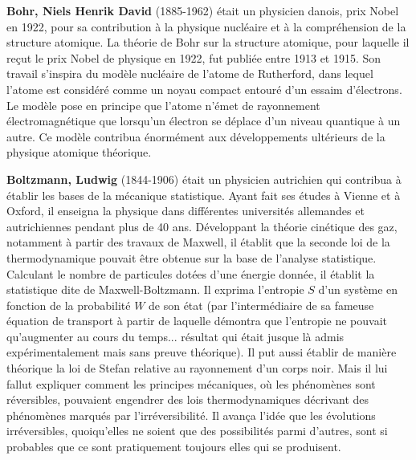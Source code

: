 \textbf{Bohr, Niels Henrik David} (1885-1962) était un physicien danois, prix Nobel en 1922, pour sa contribution à la physique nucléaire et à la compréhension de la structure atomique. La théorie de Bohr sur la structure atomique, pour laquelle il reçut le prix Nobel de physique en 1922, fut publiée entre 1913 et 1915. Son travail s'inspira du modèle nucléaire de l'atome de Rutherford, dans lequel l'atome est considéré comme un noyau compact entouré d'un essaim d'électrons. Le modèle pose en principe que l'atome n'émet de rayonnement électromagnétique que lorsqu'un électron se déplace d'un niveau quantique à un autre. Ce modèle contribua énormément aux développements ultérieurs de la physique atomique théorique.

\textbf{Boltzmann, Ludwig} (1844-1906) était un physicien autrichien qui contribua à établir les bases de la mécanique statistique. Ayant fait ses études à Vienne et à Oxford, il enseigna la physique dans différentes universités allemandes et autrichiennes pendant plus de 40 ans. Développant la théorie cinétique des gaz, notamment à partir des travaux de Maxwell, il établit que la seconde loi de la thermodynamique pouvait être obtenue sur la base de l'analyse statistique. Calculant le nombre de particules dotées d'une énergie donnée, il établit la statistique dite de Maxwell-Boltzmann. Il exprima l'entropie $S$ d'un système en fonction de la probabilité $W$ de son état (par l'intermédiaire de sa fameuse équation de transport à partir de laquelle démontra que l'entropie ne pouvait qu'augmenter au cours du temps... résultat qui était jusque là admis expérimentalement mais sans preuve théorique). Il put aussi établir de manière théorique la loi de Stefan relative au rayonnement d'un corps noir. Mais il lui fallut expliquer comment les principes mécaniques, où les phénomènes sont réversibles, pouvaient engendrer des lois thermodynamiques décrivant des phénomènes marqués par l'irréversibilité. Il avança l'idée que les évolutions irréversibles, quoiqu'elles ne soient que des possibilités parmi d'autres, sont si probables que ce sont pratiquement toujours elles qui se produisent.

